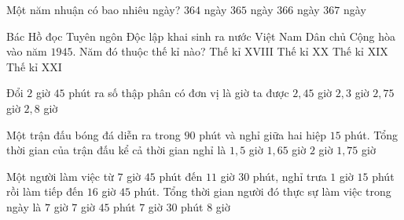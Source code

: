 \begin{ex} %
Một năm nhuận có bao nhiêu ngày?
\choice
{$364$ ngày}
{$365$ ngày}
{\True $366$ ngày}
{$367$ ngày}
\end{ex}

\begin{ex} %
Bác Hồ đọc Tuyên ngôn Độc lập khai sinh ra nước Việt Nam Dân chủ Cộng hòa vào năm $1945$. Năm đó thuộc thế kỉ nào?
\choice
{Thế kỉ XVIII}
{\True Thế kỉ XX}
{Thế kỉ XIX}
{Thế kỉ XXI}
\end{ex}

\begin{ex} %
Đổi $2$ giờ $45$ phút ra số thập phân có đơn vị là giờ ta được
\choice
{$2{,}45$ giờ}
{$2{,}3$ giờ}
{\True $2{,}75$ giờ}
{$2{,}8$ giờ}
\end{ex}

\begin{ex} %
Một trận đấu bóng đá diễn ra trong $90$ phút và nghỉ giữa hai hiệp $15$ phút. Tổng thời gian của trận đấu kể cả thời gian nghỉ là
\choice
{$1{,}5$ giờ}
{$1{,}65$ giờ}
{$2$ giờ}
{\True $1{,}75$ giờ}
\end{ex}

\begin{ex} %
Một người làm việc từ $7$ giờ $45$ phút đến $11$ giờ $30$ phút, nghỉ trưa $1$ giờ $15$ phút rồi làm tiếp đến $16$ giờ $45$ phút. Tổng thời gian người đó thực sự làm việc trong ngày là
\choice
{$7$ giờ}
{$7$ giờ $45$ phút}
{\True $7$ giờ $30$ phút}
{$8$ giờ}
\end{ex}

